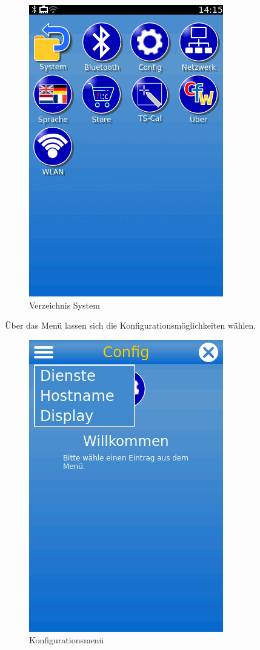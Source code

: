 \documentclass[
  paper=A4,
  ngerman,
  fontsize=12pt,
  parskip=half-,
]{scrbook}
\begin{document}
\begin{figure}[h]
\centering
\includegraphics[scale=0.4]{images/gui-system.png}
\caption{Verzeichnis System}
\end{figure}

Über das Menü lassen sich die Konfigurationsmöglichkeiten wählen.

\begin{figure}[h]
\centering
\includegraphics[scale=0.4]{images/config-menu.png}
\caption{Konfigurationsmenü}
\end{figure}
\end{document}

